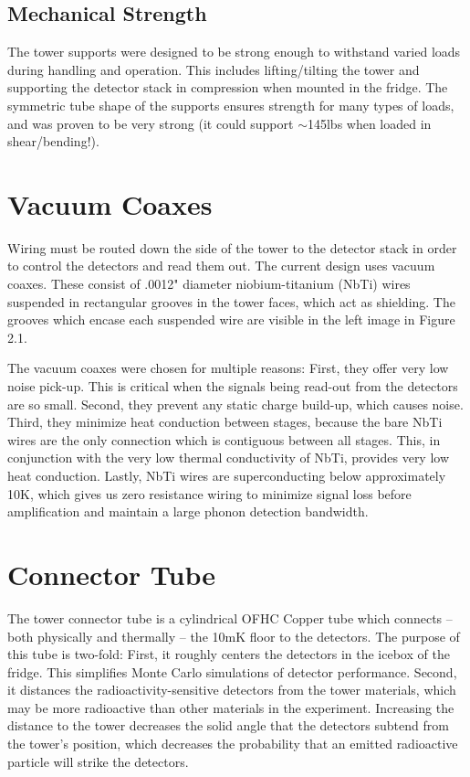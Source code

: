 \documentclass{report}
\begin{document}
\subsection{Mechanical Strength}
The tower supports were designed to be strong enough to withstand varied loads during handling and operation. This includes lifting/tilting the tower and supporting the detector stack in compression when mounted in the fridge. The symmetric tube shape of the supports ensures strength for many types of loads, and was proven to be very strong (it could support $\sim$145lbs when loaded in shear/bending!).


\section{Vacuum Coaxes}
Wiring must be routed down the side of the tower to the detector stack in order to control the detectors and read them out. The current design uses vacuum coaxes. These consist of .0012" diameter niobium-titanium (NbTi) wires suspended in rectangular grooves in the tower faces, which act as shielding. The grooves which encase each suspended wire are visible in the left image in Figure 2.1.

The vacuum coaxes were chosen for multiple reasons: First, they offer very low noise pick-up. This is critical when the signals being read-out from the detectors are so small. Second, they prevent any static charge build-up, which causes noise. Third, they minimize heat conduction between stages, because the bare NbTi wires are the only connection which is contiguous between all stages. This, in conjunction with the very low thermal conductivity of NbTi, provides very low heat conduction. Lastly, NbTi wires are superconducting below approximately 10K, which gives us zero resistance wiring to minimize signal loss before amplification and maintain a large phonon detection bandwidth.

\section{Connector Tube}
The tower connector tube is a cylindrical OFHC Copper tube which connects -- both physically and thermally -- the 10mK floor to the detectors. The purpose of this tube is two-fold: First, it roughly centers the detectors in the icebox of the fridge. This simplifies Monte Carlo simulations of detector performance. Second, it distances the radioactivity-sensitive detectors from the tower materials, which may be more radioactive than other materials in the experiment. Increasing the distance to the tower decreases the solid angle that the detectors subtend from the tower's position, which decreases the probability that an emitted radioactive particle will strike the detectors.
\end{document}
